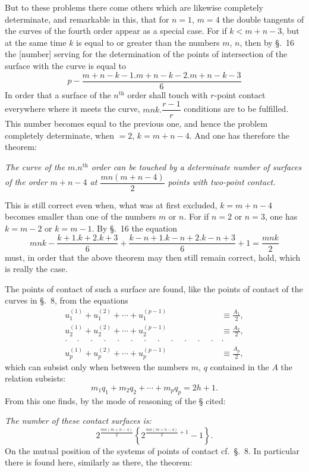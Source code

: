 \documentclass{article}
\begin{document}
But to these problems there come others which are likewise completely determinate, and remarkable in this, that for $n=1$, $m=4$ the double tangents of the curves of the fourth order appear as a special case. For if $k<m+n-3$, but at the same time $k$ is equal to or greater than the numbers $m$, $n$, then by §.~16 the [number] serving for the determination of the points of intersection of the surface with the curve is equal to
\[
p-\frac{m+n-k-1.m+n-k-2.m+n-k-3}{6}
\]
In order that a surface of the $n^{\text{th}}$ order shall touch with $r$-point contact everywhere where it meets the curve, $mnk.\dfrac{r-1}{r}$ conditions are to be fulfilled. This number becomes equal to the previous one, and hence the problem completely determinate, when  $= 2$, $k = m+n-4$. And one has therefore the theorem:

\emph{The curve of the $m.n^{\text{th}}$ order can be touched by a determinate number of surfaces of the order $m+n-4$ at $\dfrac{mn(m+n-4)}{2}$ points with two-point contact.}

This is still correct even when, what was at first excluded, $k = m+n-4$ becomes smaller than one of the numbers $m$ or $n$. For if $n=2$ or $n=3$, one has $k=m-2$ or $k=m-1$. By §.~16 the equation
\[
mnk-\frac{k+1.k+2.k+3}{6}+\frac{k-n+1.k-n+2.k-n+3}{6}+1 = \frac{mnk}{2}
\]
must, in order that the above theorem may then still remain correct, hold, which is really the case.

The points of contact of such a surface are found, like the points of contact of the curves in §.~8, from the equations
\[
\begin{aligned}
u_{1}^{(1)}+u_{1}^{(2)}+\cdots+u_{1}^{(p-1)} &\equiv \frac{A_{1}}{2},\\
u_{2}^{(1)}+u_{2}^{(2)}+\cdots+u_{2}^{(p-1)} &\equiv \frac{A_{2}}{2},\\
\cdot\quad\cdot\quad\cdot\quad\cdot\quad\cdot\quad\cdot\quad\cdot\quad\cdot\quad\cdot\quad\cdot\quad\cdot\quad\cdot & \cdot\\
u_{p}^{(1)}+u_{p}^{(2)}+\cdots+u_{p}^{(p-1)} &\equiv \frac{A_{p}}{2},
\end{aligned}
\]
which can subsist only when between the numbers $m$, $q$ contained in the $A$ the relation subsists:
\[
m_{1}q_{1}+m_{2}q_{2}+\cdots+m_{p}q_{p} = 2h+1.
\]
From this one finds, by the mode of reasoning of the § cited:


\emph{The number of these contact surfaces is:}
\[
2^{\frac{mn(m+n-4)}{2}}\left\{2^{\frac{mn(m+n-4)}{2}+1}-1\right\}.
\]
On the mutual position of the systems of points of contact cf.\ §.~8. In particular there is found here, similarly as there, the theorem:
\end{document}
